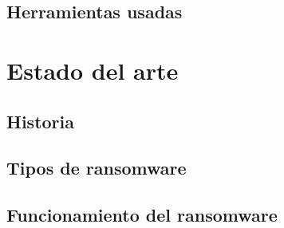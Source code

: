 \documentclass[12pt,a4paper]{article}
\begin{document}
\subsection{Herramientas usadas}                                         %





\section{Estado del arte}                                                %
\subsection{Historia}                                                    %
\subsection{Tipos de ransomware}                                         %
\medskip                                                                 %
\subsection{Funcionamiento del ransomware}                               %
\end{document}
